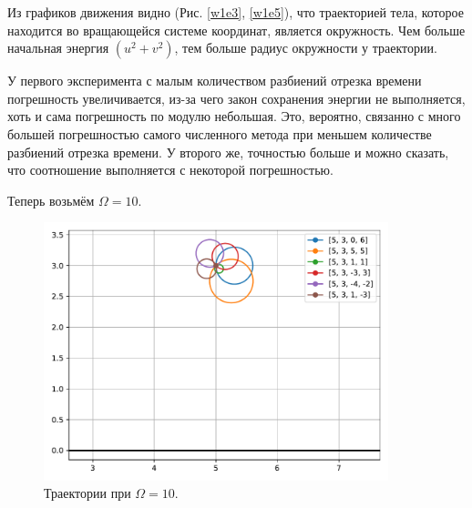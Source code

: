         Из графиков движения видно (Рис. \ref{w1e3}, \ref{w1e5}), что траекторией тела, которое находится во вращающейся системе координат, является окружность. Чем больше начальная энергия \( (u^2 + v^2) \), тем больше радиус окружности у траектории.

        У первого эксперимента с малым количеством разбиений отрезка времени погрешность увеличивается, из-за чего закон сохранения энергии не выполняется, хоть и сама погрешность по модулю небольшая. Это, вероятно, связанно с много большей погрешностью самого численного метода при меньшем количестве разбиений отрезка времени. У второго же, точностью больше и можно сказать, что соотношение выполняется с некоторой погрешностью.

        Теперь возьмём \( \Omega = 10 \).
        \begin{figure}[H]
            \centering
            \includegraphics[width=10cm]{pictures/w10_3plot.pdf}
            \caption{Траектории при \( \Omega = 10 \).} \label{om10}
        \end{figure}

